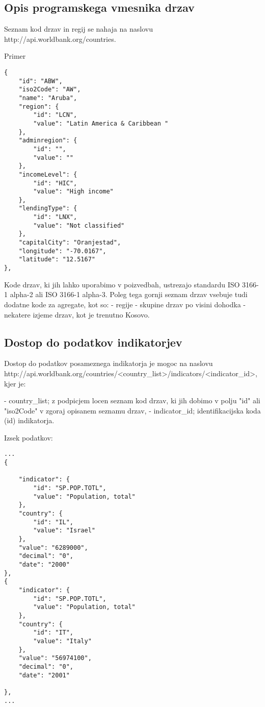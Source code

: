 \subsection{Opis programskega vmesnika drzav}
Seznam kod drzav in regij se nahaja na naslovu 
http://api.worldbank.org/countries.

Primer

\begin{lstlisting}
{
    "id": "ABW",
    "iso2Code": "AW",
    "name": "Aruba",
    "region": {
        "id": "LCN",
        "value": "Latin America & Caribbean "
    },
    "adminregion": {
        "id": "",
        "value": ""
    },
    "incomeLevel": {
        "id": "HIC",
        "value": "High income"
    },
    "lendingType": {
        "id": "LNX",
        "value": "Not classified"
    },
    "capitalCity": "Oranjestad",
    "longitude": "-70.0167",
    "latitude": "12.5167"
},
\end{lstlisting}

Kode drzav, ki jih lahko uporabimo v poizvedbah, ustrezajo standardu ISO 
3166-1  
alpha-2 ali ISO 3166-1 alpha-3.
Poleg tega gornji seznam drzav vsebuje tudi dodatne kode za agregate, kot so:
- regije
- skupine drzav po visini dohodka
- nekatere izjeme drzav, kot je trenutno Kosovo.



\subsection{Dostop do podatkov indikatorjev}
Dostop do podatkov posameznega indikatorja je mogoc na naslovu
http://api.worldbank.org/countries/<country\_list>/indicators/<indicator\_id>,
kjer je:

- country\_list; z podpicjem locen seznam kod drzav, ki jih dobimo v polju "id"
ali "iso2Code" v zgoraj opisanem seznamu drzav,
- indicator\_id; identifikacijska koda (id) indikatorja.


Izsek podatkov:
\begin{lstlisting}
...
{

    "indicator": {
        "id": "SP.POP.TOTL",
        "value": "Population, total"
    },
    "country": {
        "id": "IL",
        "value": "Israel"
    },
    "value": "6289000",
    "decimal": "0",
    "date": "2000"
},
{
    "indicator": {
        "id": "SP.POP.TOTL",
        "value": "Population, total"
    },
    "country": {
        "id": "IT",
        "value": "Italy"
    },
    "value": "56974100",
    "decimal": "0",
    "date": "2001"

},
...
\end{lstlisting}


